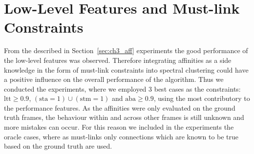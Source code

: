 \section{Low-Level Features and Must-link Constraints}
\label{sec:llf}
From the described in Section~\ref{sec:ch3_aff} experiments the good performance of the low-level features was observed. Therefore integrating affinities as a side knowledge in the form of must-link constraints 
into spectral clustering could have a positive influence on the overall performance of the algorithm.
Thus we conducted the experiments, where we employed 3 best cases as the constraints: $\mathrm{ltt\geq 0.9}$, $\mathrm{(sta=1)\cup(stm=1)}$ and $\mathrm{aba\geq 0.9}$, using the most contributory to the performance features. 
As the affinities were only evaluated on the ground truth frames, the behaviour within and across other frames is still unknown and more mistakes can occur. 
For this reason we included in the experiments the oracle cases, where as must-links only connections which are known to be true based on the ground truth are used.

